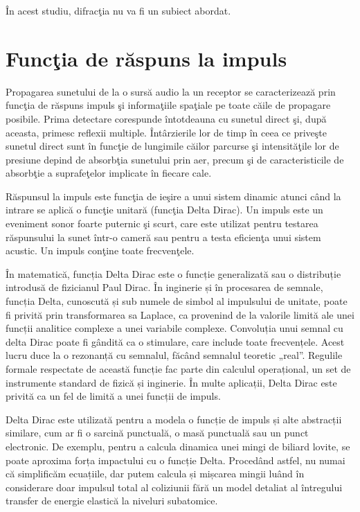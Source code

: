 	\^{I}n acest studiu, difrac\c{t}ia nu va fi un subiect abordat.
	
	\section{Func\c{t}ia de r\u{a}spuns la impuls}
	
	Propagarea sunetului de la o surs\u{a} audio la un receptor se caracterizeaz\u{a} prin func\c{t}ia de r\u{a}spuns impuls \c{s}i informa\c{t}iile spa\c{t}iale pe toate c\u{a}ile de propagare posibile. Prima detectare corespunde \^{i}ntotdeauna cu sunetul direct \c{s}i, dup\u{a} aceasta, primesc reflexii multiple. \^{I}nt\^{a}rzierile lor de timp \^{i}n ceea ce prive\c{s}te sunetul direct sunt \^{i}n func\c{t}ie de lungimile c\u{a}ilor parcurse \c{s}i intensit\u{a}\c{t}ile lor de presiune depind de absorb\c{t}ia sunetului prin aer, precum \c{s}i de caracteristicile de absorb\c{t}ie a suprafe\c{t}elor implicate \^{i}n fiecare cale.
	 
	
	R\u{a}spunsul la impuls este func\c{t}ia de ie\c{s}ire a unui sistem dinamic atunci c\^{a}nd la intrare se aplic\u{a} o func\c{t}ie unitar\u{a} (func\c{t}ia Delta Dirac). Un impuls este un eveniment sonor foarte puternic \c{s}i scurt, care este utilizat pentru testarea r\u{a}spunsului la sunet \^{i}ntr-o camer\u{a} sau pentru a testa eficien\c{t}a unui sistem acustic. Un impuls con\c{t}ine toate frecven\c{t}ele.
	  
	În matematică, funcția Delta Dirac este o funcție generalizată sau o distribuție introdusă de fizicianul Paul Dirac. În inginerie și în procesarea de semnale, funcția Delta, cunoscută și sub numele de simbol al impulsului de unitate, poate fi privită prin transformarea sa Laplace, ca provenind de la valorile limită ale unei funcții analitice complexe a unei variabile complexe. Convoluția unui semnal cu delta Dirac poate fi gândită ca o stimulare, care include toate frecvențele. Acest lucru duce la o rezonanță cu semnalul, făcând semnalul teoretic „real”. Regulile formale respectate de această funcție fac parte din calculul operațional, un set de instrumente standard de fizică și inginerie. În multe aplicații, Delta Dirac este privită ca un fel de limită a unei funcții de impuls.
	
	Delta Dirac este utilizată pentru a modela o funcție de impuls și alte abstracții similare, cum ar fi o sarcină punctuală, o masă punctuală sau un punct electronic. De exemplu, pentru a calcula dinamica unei mingi de biliard lovite, se poate aproxima forța impactului cu o funcție Delta. Procedând astfel, nu numai că simplificăm ecuațiile, dar putem calcula și mișcarea mingii luând în considerare doar impulsul total al coliziunii fără un model detaliat al întregului transfer de energie elastică la niveluri subatomice.
	
